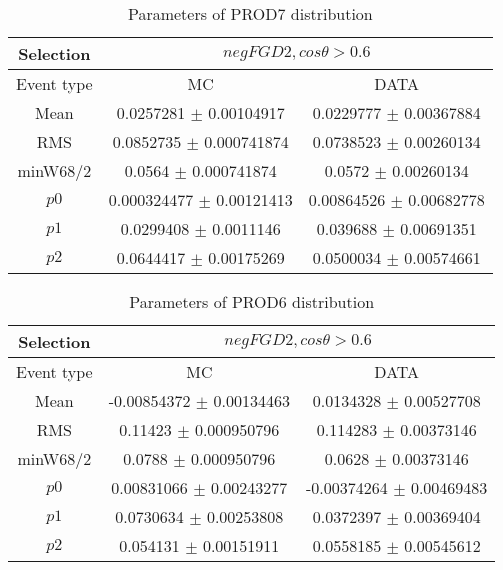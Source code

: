 \documentclass[a4paper,12pt]{article}
\begin{document}
\begin{table}[htbp]
\begin{center}
\begin{tabular}{|c|c|c|}
        \hline
        Selection & \multicolumn{2}{|c|}{$negFGD2, cos\theta>0.6$}  \\ \hline
        Event type & MC & DATA \\ 
        \hline
        Mean & 0.0257281 $\pm$ 0.00104917 & 0.0229777 $\pm$ 0.00367884 \\ 
        \hline 
        RMS & 0.0852735 $\pm$ 0.000741874 & 0.0738523 $\pm$ 0.00260134 \\ 
        \hline 
        minW68/2 & 0.0564 $\pm$ 0.000741874 & 0.0572 $\pm$ 0.00260134 \\ 
        \hline 
        $p0$ & 0.000324477 $\pm$ 0.00121413 & 0.00864526 $\pm$ 0.00682778 \\ 
        \hline 
        $p1$ & 0.0299408 $\pm$ 0.0011146 & 0.039688 $\pm$ 0.00691351 \\ 
        \hline 
        $p2$ & 0.0644417 $\pm$ 0.00175269 & 0.0500034 $\pm$ 0.00574661 \\ 
        \hline 
\end{tabular}
\caption{Parameters of PROD7 distribution } \vspace{0.2in}
\label{xxx}
\end{center}
\end{table}
\begin{table}[htbp]
\begin{center}
\begin{tabular}{|c|c|c|}
        \hline
        Selection & \multicolumn{2}{|c|}{$negFGD2, cos\theta>0.6$}  \\ \hline
        Event type & MC & DATA \\ 
        \hline
        Mean & -0.00854372 $\pm$ 0.00134463 & 0.0134328 $\pm$ 0.00527708 \\ 
        \hline 
        RMS & 0.11423 $\pm$ 0.000950796 & 0.114283 $\pm$ 0.00373146 \\ 
        \hline 
        minW68/2 & 0.0788 $\pm$ 0.000950796 & 0.0628 $\pm$ 0.00373146 \\ 
        \hline 
        $p0$ & 0.00831066 $\pm$ 0.00243277 & -0.00374264 $\pm$ 0.00469483 \\ 
        \hline 
        $p1$ & 0.0730634 $\pm$ 0.00253808 & 0.0372397 $\pm$ 0.00369404 \\ 
        \hline 
        $p2$ & 0.054131 $\pm$ 0.00151911 & 0.0558185 $\pm$ 0.00545612 \\ 
        \hline 
\end{tabular}
\caption{Parameters of PROD6 distribution } \vspace{0.2in}
\label{xxx}
\end{center}
\end{table}
\end{document}

